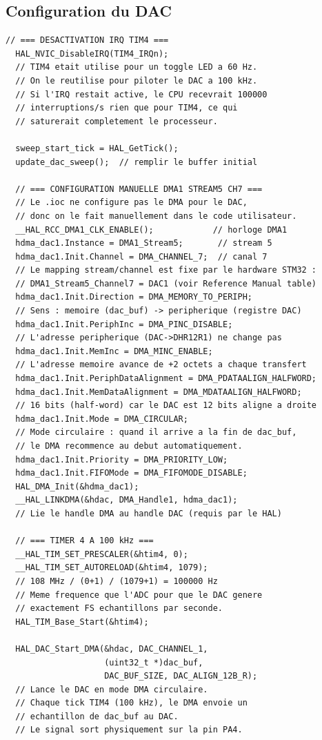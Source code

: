 \documentclass[a4paper,11pt]{article}
\begin{document}
\subsection{Configuration du DAC}

\begin{lstlisting}[style=cstyle,caption={Init manuelle du DMA DAC et d\'emarrage du balayage}]
  // === DESACTIVATION IRQ TIM4 ===
  HAL_NVIC_DisableIRQ(TIM4_IRQn);
  // TIM4 etait utilise pour un toggle LED a 60 Hz.
  // On le reutilise pour piloter le DAC a 100 kHz.
  // Si l'IRQ restait active, le CPU recevrait 100000
  // interruptions/s rien que pour TIM4, ce qui
  // saturerait completement le processeur.

  sweep_start_tick = HAL_GetTick();
  update_dac_sweep();  // remplir le buffer initial

  // === CONFIGURATION MANUELLE DMA1 STREAM5 CH7 ===
  // Le .ioc ne configure pas le DMA pour le DAC,
  // donc on le fait manuellement dans le code utilisateur.
  __HAL_RCC_DMA1_CLK_ENABLE();            // horloge DMA1
  hdma_dac1.Instance = DMA1_Stream5;       // stream 5
  hdma_dac1.Init.Channel = DMA_CHANNEL_7;  // canal 7
  // Le mapping stream/channel est fixe par le hardware STM32 :
  // DMA1_Stream5_Channel7 = DAC1 (voir Reference Manual table)
  hdma_dac1.Init.Direction = DMA_MEMORY_TO_PERIPH;
  // Sens : memoire (dac_buf) -> peripherique (registre DAC)
  hdma_dac1.Init.PeriphInc = DMA_PINC_DISABLE;
  // L'adresse peripherique (DAC->DHR12R1) ne change pas
  hdma_dac1.Init.MemInc = DMA_MINC_ENABLE;
  // L'adresse memoire avance de +2 octets a chaque transfert
  hdma_dac1.Init.PeriphDataAlignment = DMA_PDATAALIGN_HALFWORD;
  hdma_dac1.Init.MemDataAlignment = DMA_MDATAALIGN_HALFWORD;
  // 16 bits (half-word) car le DAC est 12 bits aligne a droite
  hdma_dac1.Init.Mode = DMA_CIRCULAR;
  // Mode circulaire : quand il arrive a la fin de dac_buf,
  // le DMA recommence au debut automatiquement.
  hdma_dac1.Init.Priority = DMA_PRIORITY_LOW;
  hdma_dac1.Init.FIFOMode = DMA_FIFOMODE_DISABLE;
  HAL_DMA_Init(&hdma_dac1);
  __HAL_LINKDMA(&hdac, DMA_Handle1, hdma_dac1);
  // Lie le handle DMA au handle DAC (requis par le HAL)

  // === TIMER 4 A 100 kHz ===
  __HAL_TIM_SET_PRESCALER(&htim4, 0);
  __HAL_TIM_SET_AUTORELOAD(&htim4, 1079);
  // 108 MHz / (0+1) / (1079+1) = 100000 Hz
  // Meme frequence que l'ADC pour que le DAC genere
  // exactement FS echantillons par seconde.
  HAL_TIM_Base_Start(&htim4);

  HAL_DAC_Start_DMA(&hdac, DAC_CHANNEL_1,
                    (uint32_t *)dac_buf,
                    DAC_BUF_SIZE, DAC_ALIGN_12B_R);
  // Lance le DAC en mode DMA circulaire.
  // Chaque tick TIM4 (100 kHz), le DMA envoie un
  // echantillon de dac_buf au DAC.
  // Le signal sort physiquement sur la pin PA4.
\end{lstlisting}
\end{document}
